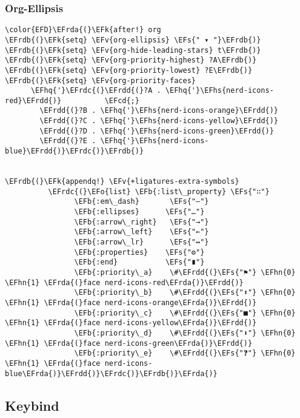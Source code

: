 \documentclass{article}
\newcommand{\EFcd}[1]{\textcolor{EFcd}{#1}} %
\newcommand{\EFs}[1]{\textcolor{EFs}{#1}} %
\newcommand{\EFk}[1]{\textcolor{EFk}{#1}} %
\newcommand{\EFb}[1]{\textcolor{EFb}{#1}} %
\newcommand{\EFv}[1]{\textcolor{EFv}{#1}} %
\newcommand{\EFo}[1]{\textcolor{EFo}{#1}} %
\newcommand{\EFhn}[1]{\textcolor{EFhn}{\textbf{#1}}} %
\newcommand{\EFhq}[1]{#1} %
\newcommand{\EFhs}[1]{\textcolor{EFhs}{#1}} %
\newcommand{\EFrda}[1]{\textcolor{EFrda}{#1}} %
\newcommand{\EFrdb}[1]{\textcolor{EFrdb}{#1}} %
\newcommand{\EFrdc}[1]{\textcolor{EFrdc}{#1}} %
\newcommand{\EFrdd}[1]{\textcolor{EFrdd}{#1}} %
\begin{document}
\subsubsection{Org-Ellipsis}
\label{sec:orge2a9120}
\begin{Code}
\begin{Verbatim}
\color{EFD}\EFrda{(}\EFk{after!} org
\EFrdb{(}\EFk{setq} \EFv{org-ellipsis} \EFs{" ▾ "}\EFrdb{)}
\EFrdb{(}\EFk{setq} \EFv{org-hide-leading-stars} t\EFrdb{)}
\EFrdb{(}\EFk{setq} \EFv{org-priority-highest} ?A\EFrdb{)}
\EFrdb{(}\EFk{setq} \EFv{org-priority-lowest} ?E\EFrdb{)}
\EFrdb{(}\EFk{setq} \EFv{org-priority-faces}
      \EFhq{'}\EFrdc{(}\EFrdd{(}?A . \EFhq{'}\EFhs{nerd-icons-red}\EFrdd{)}          \EFcd{;}
        \EFrdd{(}?B . \EFhq{'}\EFhs{nerd-icons-orange}\EFrdd{)}
        \EFrdd{(}?C . \EFhq{'}\EFhs{nerd-icons-yellow}\EFrdd{)}
        \EFrdd{(}?D . \EFhq{'}\EFhs{nerd-icons-green}\EFrdd{)}
        \EFrdd{(}?E . \EFhq{'}\EFhs{nerd-icons-blue}\EFrdd{)}\EFrdc{)}\EFrdb{)}


\EFrdb{(}\EFk{appendq!} \EFv{+ligatures-extra-symbols}
          \EFrdc{(}\EFo{list} \EFb{:list\_property} \EFs{"∷"}
                \EFb{:em\_dash}       \EFs{"—"}
                \EFb{:ellipses}      \EFs{"…"}
                \EFb{:arrow\_right}   \EFs{"→"}
                \EFb{:arrow\_left}    \EFs{"←"}
                \EFb{:arrow\_lr}      \EFs{"↔"}
                \EFb{:properties}    \EFs{"⚙"}
                \EFb{:end}           \EFs{"∎"}
                \EFb{:priority\_a}    \#\EFrdd{(}\EFs{"⚑"} \EFhn{0} \EFhn{1} \EFrda{(}face nerd-icons-red\EFrda{)}\EFrdd{)}
                \EFb{:priority\_b}    \#\EFrdd{(}\EFs{"⬆"} \EFhn{0} \EFhn{1} \EFrda{(}face nerd-icons-orange\EFrda{)}\EFrdd{)}
                \EFb{:priority\_c}    \#\EFrdd{(}\EFs{"■"} \EFhn{0} \EFhn{1} \EFrda{(}face nerd-icons-yellow\EFrda{)}\EFrdd{)}
                \EFb{:priority\_d}    \#\EFrdd{(}\EFs{"⬇"} \EFhn{0} \EFhn{1} \EFrda{(}face nerd-icons-green\EFrda{)}\EFrdd{)}
                \EFb{:priority\_e}    \#\EFrdd{(}\EFs{"❓"} \EFhn{0} \EFhn{1} \EFrda{(}face nerd-icons-blue\EFrda{)}\EFrdd{)}\EFrdc{)}\EFrdb{)}\EFrda{)}
\end{Verbatim}
\end{Code}

\subsection{Keybind}
\label{sec:org5343ab9}
\end{document}
